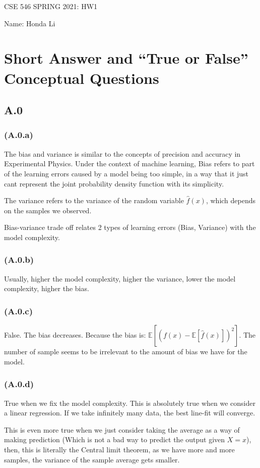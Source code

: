 \documentclass[]{article}
\begin{document}
\begin{center}
    CSE 546 SPRING 2021: HW1 
\end{center}
\begin{center}
    Name: Honda Li
\end{center}

\section*{Short Answer and ``True or False'' Conceptual Questions}
    \subsection*{A.0}
        \subsubsection*{(A.0.a)}
            \hspace{1.1em}
            The bias and variance is similar to the concepts of precision and accuracy in Experimental Physics. Under the context of machine learning, Bias refers to part of the learning errors caused by a model being too simple, in a way that it just cant represent the joint probability density function with its simplicity. 
            \par
            The variance refers to the variance of the random variable $\hat{f}(x)$, which depends on the samples we observed. 
            \par
            Bias-variance trade off relates 2 types of learning errors (Bias, Variance) with the model complexity. 
        \subsubsection*{(A.0.b)}
            \hspace{1.1em}
            Usually, higher the model complexity, higher the variance, lower the model complexity, higher the bias. 
        \subsubsection*{(A.0.c)}
            \hspace{1.1em}
            False. The bias decreases. Because the bias is: $\mathbb{E}\left[
                \left(
                f(x) - \mathbb{E}\left[\hat{f}(x)\right]
                \right)^2
            \right]$. The number of sample seems to be irrelevant to the amount of bias we have for the model. 
        \subsubsection*{(A.0.d)}
            \hspace{1.1em}
            True when we fix the model complexity. This is absolutely true when we consider a linear regression. If we take infinitely many data, the best line-fit will converge. 
            \par
            This is even more true when we just consider taking the average as a way of making prediction (Which is not a bad way to predict the output given $X = x$), then, this is literally the Central limit theorem, as we have more and more samples, the variance of the sample average gets smaller. 
\end{document}
